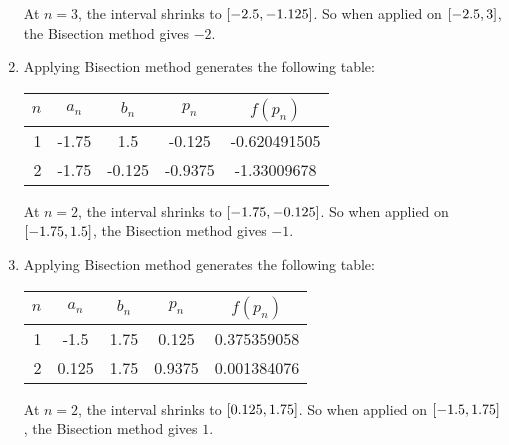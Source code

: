 \documentclass[../../../../Assignments.tex]{subfiles}
\begin{document}
\begin{solution}
\begin{enumerate}[label = (\alph*)]
            At \(n = 3\), the interval shrinks to
            \(\interval{\num{-2.5}}{\num{-1.125}}\). So when applied on
            \(\interval{\num{-2.5}}{3}\), the Bisection method gives \(-2\).

        \item Applying Bisection method generates the following table:

            \begin{table}[H]
                \centering
                \begin{tabular}{r S[table-format=-1.2] S[table-format=-1.3] S[table-format=-1.4] S[table-format=-1.9]}
                    \toprule
                    \(n\)  &   {\(a_n\)}   &   {\(b_n\)}   &   {\(p_n\)}   &  {\(f(p_n)\)}  \\
                     &  -1.75        &   1.5         &  -0.125       & -0.620491505    \\
                         2 &  -1.75        &  -0.125       &  -0.9375      & -1.33009678     \\
                    \bottomrule
                \end{tabular}
            \end{table}

            At \(n = 2\), the interval shrinks to
            \(\interval{\num{-1.75}}{\num{-0.125}}\). So when applied on
            \(\interval{\num{-1.75}}{\num{1.5}}\), the Bisection method gives
            \(-1\).

        \item Applying Bisection method generates the following table:

            \begin{table}[H]
                \centering
                \begin{tabular}{r S[table-format=-1.3] S[table-format=1.2] S[table-format=1.4] S[table-format=1.9]}
                    \toprule
                    \(n\)  &   {\(a_n\)}   &   {\(b_n\)}   &   {\(p_n\)}   &  {\(f(p_n)\)}  \\
                      &  -1.5         & 1.75          &  0.125        &  0.375359058   \\
                        2  &   0.125       & 1.75          &  0.9375       &  0.001384076   \\
                    \bottomrule
                \end{tabular}
            \end{table}

            At \(n = 2\), the interval shrinks to
            \(\interval{\num{0.125}}{\num{1.75}}\). So when applied on
            \(\interval{\num{-1.5}}{\num{1.75}}\), the Bisection method gives
            \(1\).
    \end{enumerate}
\end{solution}
\end{document}
